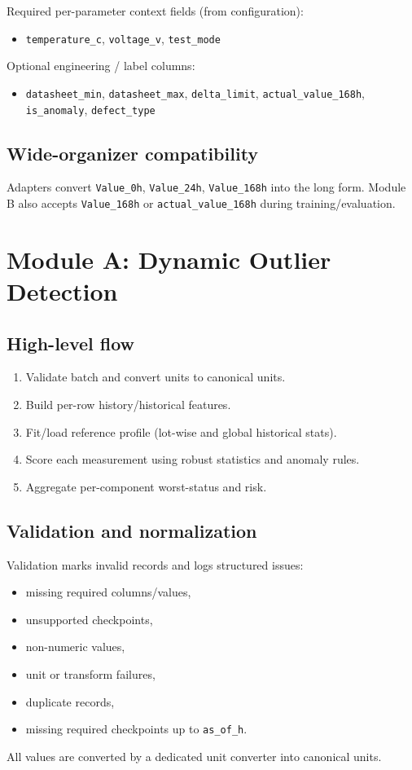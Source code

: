 \documentclass[11pt]{article}
\begin{document}
Required per-parameter context fields (from configuration):
\begin{itemize}[nosep]
  \item \texttt{temperature\_c}, \texttt{voltage\_v}, \texttt{test\_mode}
\end{itemize}

Optional engineering / label columns:
\begin{itemize}[nosep]
  \item \texttt{datasheet\_min}, \texttt{datasheet\_max}, \texttt{delta\_limit}, \texttt{actual\_value\_168h}, \texttt{is\_anomaly}, \texttt{defect\_type}
\end{itemize}

\subsection{Wide-organizer compatibility}
Adapters convert \texttt{Value\_0h}, \texttt{Value\_24h}, \texttt{Value\_168h} into the long form.  
Module B also accepts \texttt{Value\_168h} or \texttt{actual\_value\_168h} during training/evaluation.

\section{Module A: Dynamic Outlier Detection}

\subsection{High-level flow}
\begin{enumerate}
  \item Validate batch and convert units to canonical units.
  \item Build per-row history/historical features.
  \item Fit/load reference profile (lot-wise and global historical stats).
  \item Score each measurement using robust statistics and anomaly rules.
  \item Aggregate per-component worst-status and risk.
\end{enumerate}

\subsection{Validation and normalization}
Validation marks invalid records and logs structured issues:
\begin{itemize}[nosep]
  \item missing required columns/values,
  \item unsupported checkpoints,
  \item non-numeric values,
  \item unit or transform failures,
  \item duplicate records,
  \item missing required checkpoints up to \texttt{as\_of\_h}.
\end{itemize}
All values are converted by a dedicated unit converter into canonical units.
\end{document}
